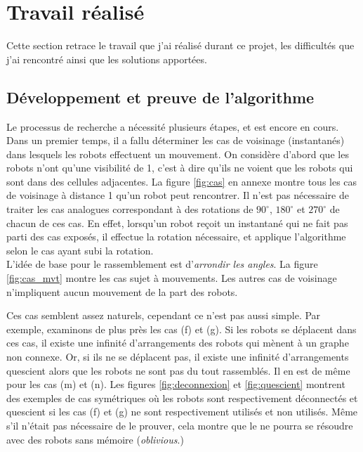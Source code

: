 \newcommand{\Gathered}{\ensuremath{\textsc{gathered}}\xspace}

\theoremstyle{plain}
\newtheorem{thm}{Theorem}
\newtheorem{lem}[thm]{Lemma}
\newtheorem{prop}[thm]{Proposition}
\newtheorem*{cor}{Corollary}

\theoremstyle{definition}
\newtheorem{defn}{Definition}[section]
\newtheorem{conj}{Conjecture}[section]
\newtheorem{exmp}{Example}[section]

\theoremstyle{remark}
\newtheorem*{rem}{Remark}
\newtheorem*{note}{Note}

\section{Travail réalisé}

Cette section retrace le travail que j'ai réalisé durant ce projet, les
difficultés que j'ai rencontré ainsi que les solutions apportées.

\subsection{Développement et preuve de l'algorithme}

Le processus de recherche a nécessité plusieurs étapes, et est encore en cours.
Dans un premier temps, il a fallu déterminer les cas de voisinage (instantanés)
dans lesquels les robots effectuent un mouvement. On considère d'abord que les
robots n'ont qu'une visibilité de 1, c'est à dire qu'ils ne voient que les
robots qui sont dans des cellules adjacentes. La figure \ref{fig:cas} en annexe
montre tous les cas de voisinage à distance 1 qu'un robot peut rencontrer. Il
n'est pas nécessaire de traiter les cas analogues correspondant à des rotations
de $90^\circ{}$, $180^\circ{}$ et $270^\circ{}$ de chacun de ces cas.  En
effet, lorsqu'un robot reçoit un instantané qui ne fait pas parti des cas
exposés, il effectue la rotation nécessaire, et applique l'algorithme selon le
cas ayant subi la rotation. \\

L'idée de base pour le rassemblement est d'\textit{arrondir les angles}. La
figure \ref{fig:cas_mvt} montre les cas sujet à mouvements. Les autres cas
de voisinage n'impliquent aucun mouvement de la part des robots.



Ces cas semblent assez naturels, cependant ce n'est pas aussi simple. Par
exemple, examinons de plus près les cas (f) et (g). Si les robots se déplacent
dans ces cas, il existe une infinité d'arrangements des robots qui mènent à un
graphe non connexe. Or, si ils ne se déplacent pas, il existe une infinité
d'arrangements quescient alors que les robots ne sont pas du tout rassemblés.
Il en est de même pour les cas (m) et (n). Les figures \ref{fig:deconnexion} et
\ref{fig:quescient} montrent des exemples de cas symétriques où les robots sont
respectivement déconnectés et quescient si les cas (f) et (g) ne sont
respectivement utilisés et non utilisés. Même s'il n'était pas nécessaire de le
prouver, cela montre que le \GatheringProblem ne pourra se résoudre avec des
robots sans mémoire (\textit{oblivious}.)

